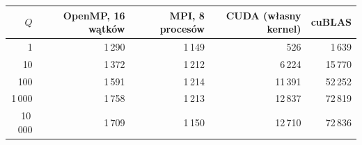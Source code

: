 \begin{tabular}{rrrrr}
\toprule
$Q$ & OpenMP, 16 wątków & MPI, 8 procesów & CUDA (własny kernel) & cuBLAS \\
\midrule
1 & 1\,290 & 1\,149 & 526 & 1\,639 \\
10 & 1\,372 & 1\,212 & 6\,224 & 15\,770 \\
100 & 1\,591 & 1\,214 & 11\,391 & 52\,252 \\
1\,000 & 1\,758 & 1\,213 & 12\,837 & 72\,819 \\
10\,000 & 1\,709 & 1\,150 & 12\,710 & 72\,836 \\
\bottomrule
\end{tabular}
